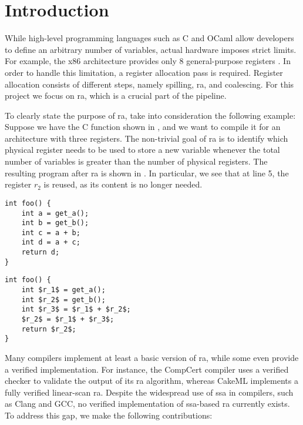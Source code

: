 
\chapter{Introduction}
\label{cha:intro}

While high-level programming languages such as C and OCaml allow developers to define an arbitrary number of variables, actual hardware imposes strict limits. For example, the x86 architecture provides only 8 general-purpose registers \cite{intel-sdm-vol1}.
In order to handle this limitation, a register allocation pass is required. Register allocation consists of different steps, namely spilling, \gls{ra}, and coalescing. For this project we focus on \gls{ra}, which is a crucial part of the pipeline.

To clearly state the purpose of \gls{ra}, take into consideration the following example: Suppose we have the C function shown in , and we want to compile it for an architecture with three registers. The non-trivial goal of \gls{ra} is to identify which physical register needs to be used to store a new variable whenever the total number of variables is greater than the number of physical registers. The resulting program after \gls{ra} is shown in . In particular, we see that at line 5, the register $r_2$ is reused, as its content is no longer needed.

\begin{minipage}{0.48\linewidth}
\centering
\lstset{style=C}
\begin{lstlisting}[caption={C program returning $2a+b$.}, label={fig:cbefore}]
int foo() {
    int a = get_a();
    int b = get_b();
    int c = a + b;
    int d = a + c;
    return d;
}
\end{lstlisting}
\end{minipage}
\hfill
\begin{minipage}{0.48\linewidth}
\centering
\lstset{style=C}
\begin{lstlisting}[caption={Same C program after \gls{ra}.}, label={fig:cafter}]
int foo() {
    int $r_1$ = get_a();
    int $r_2$ = get_b();
    int $r_3$ = $r_1$ + $r_2$;
    $r_2$ = $r_1$ + $r_3$;
    return $r_2$;
}
\end{lstlisting}
\end{minipage}

Many compilers implement at least a basic version of \gls{ra}, while some even provide a verified implementation. For instance, the CompCert \cite{Rideau-Leroy-regalloc} compiler uses a verified checker to validate the output of its \gls{ra} algorithm, whereas CakeML \cite{10.1145/2578855.2535841} implements a fully verified linear-scan \gls{ra}. Despite the widespread use of \gls{ssa} in compilers, such as Clang and GCC, no verified implementation of \gls{ssa}-based \gls{ra} currently exists. To address this gap, we make the following contributions:

